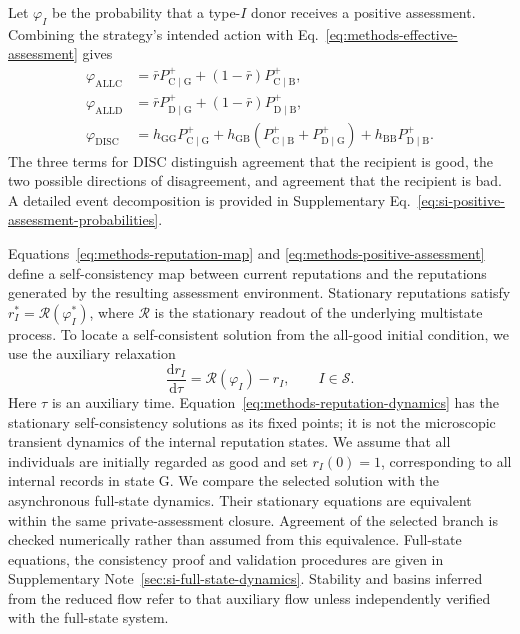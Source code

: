 \documentclass[fleqn,10pt]{wlscirep}
\begin{document}
Let $\varphi_I$ be the probability that a type-$I$ donor receives a positive assessment. Combining the strategy's intended action with Eq.~\eqref{eq:methods-effective-assessment} gives
\begin{equation}
\begin{aligned}
\varphi_{\mathrm{ALLC}}
&=\bar rP^+_{\mathrm{C}\mid\mathrm{G}}
+(1-\bar r)P^+_{\mathrm{C}\mid\mathrm{B}},\\
\varphi_{\mathrm{ALLD}}
&=\bar rP^+_{\mathrm{D}\mid\mathrm{G}}
+(1-\bar r)P^+_{\mathrm{D}\mid\mathrm{B}},\\
\varphi_{\mathrm{DISC}}
&=h_{\mathrm{GG}}P^+_{\mathrm{C}\mid\mathrm{G}}
+h_{\mathrm{GB}}
\left(P^+_{\mathrm{C}\mid\mathrm{B}}
+P^+_{\mathrm{D}\mid\mathrm{G}}\right)
+h_{\mathrm{BB}}P^+_{\mathrm{D}\mid\mathrm{B}}.
\end{aligned}
\label{eq:methods-positive-assessment}
\end{equation}
The three terms for $\mathrm{DISC}$ distinguish agreement that the recipient is good, the two possible directions of disagreement, and agreement that the recipient is bad. A detailed event decomposition is provided in Supplementary Eq.~\eqref{eq:si-positive-assessment-probabilities}.

Equations~\eqref{eq:methods-reputation-map} and \eqref{eq:methods-positive-assessment} define a self-consistency map between current reputations and the reputations generated by the resulting assessment environment. Stationary reputations satisfy $r_I^*=\mathcal R(\varphi_I^*)$, where $\mathcal R$ is the stationary readout of the underlying multistate process. To locate a self-consistent solution from the all-good initial condition, we use the auxiliary relaxation
\begin{equation}
\frac{\mathrm dr_I}{\mathrm d\tau}
=\mathcal R(\varphi_I)-r_I,
\qquad I\in\mathcal S.
\label{eq:methods-reputation-dynamics}
\end{equation}
Here $\tau$ is an auxiliary time. Equation~\eqref{eq:methods-reputation-dynamics} has the stationary self-consistency solutions as its fixed points; it is not the microscopic transient dynamics of the internal reputation states. We assume that all individuals are initially regarded as good and set $r_I(0)=1$, corresponding to all internal records in state $\mathrm G$. We compare the selected solution with the asynchronous full-state dynamics. Their stationary equations are equivalent within the same private-assessment closure. Agreement of the selected branch is checked numerically rather than assumed from this equivalence. Full-state equations, the consistency proof and validation procedures are given in Supplementary Note~\ref{sec:si-full-state-dynamics}. Stability and basins inferred from the reduced flow refer to that auxiliary flow unless independently verified with the full-state system.
\end{document}
